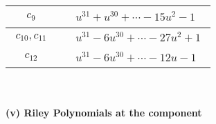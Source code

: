 \documentclass[1p]{elsarticle_modified}
\theoremstyle{definition}
\begin{document}
\begin{tabular}{m{50pt}|m{274pt}}
\hline $$\begin{aligned}c_{9}\end{aligned}$$&$\begin{aligned}
&u^{31}+u^{30}+\cdots-15 u^2-1
\end{aligned}$\\
\hline $$\begin{aligned}c_{10},c_{11}\end{aligned}$$&$\begin{aligned}
&u^{31}-6 u^{30}+\cdots-27 u^2+1
\end{aligned}$\\
\hline $$\begin{aligned}c_{12}\end{aligned}$$&$\begin{aligned}
&u^{31}-6 u^{30}+\cdots-12 u-1
\end{aligned}$\\
\hline
\end{tabular}\\~\\
\newpage\renewcommand{\arraystretch}{1}
\flushleft \textbf{(v) Riley Polynomials at the component}\newline \\
\end{document}
